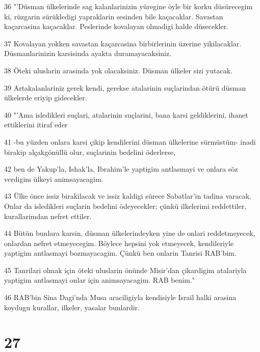 \par 36 "'Düsman ülkelerinde sag kalanlarinizin yüregine öyle bir korku düsürecegim ki, rüzgarin sürükledigi yapraklarin sesinden bile kaçacaklar. Savastan kaçarcasina kaçacaklar. Peslerinde kovalayan olmadigi halde düsecekler.
\par 37 Kovalayan yokken savastan kaçarcasina birbirlerinin üzerine yikilacaklar. Düsmanlarinizin karsisinda ayakta duramayacaksiniz.
\par 38 Öteki uluslarin arasinda yok olacaksiniz. Düsman ülkeler sizi yutacak.
\par 39 Artakalanlariniz gerek kendi, gerekse atalarinin suçlarindan ötürü düsman ülkelerde eriyip gidecekler.
\par 40 "'Ama isledikleri suçlari, atalarinin suçlarini, bana karsi geldiklerini, ihanet ettiklerini itiraf eder
\par 41 -bu yüzden onlara karsi çikip kendilerini düsman ülkelerine sürmüstüm- inadi birakip alçakgönüllü olur, suçlarinin bedelini öderlerse,
\par 42 ben de Yakup'la, Ishak'la, Ibrahim'le yaptigim antlasmayi ve onlara söz verdigim ülkeyi animsayacagim.
\par 43 Ülke önce issiz birakilacak ve issiz kaldigi sürece Sabatlar'in tadina varacak. Onlar da isledikleri suçlarin bedelini ödeyecekler; çünkü ilkelerimi reddettiler, kurallarimdan nefret ettiler.
\par 44 Bütün bunlara karsin, düsman ülkelerindeyken yine de onlari reddetmeyecek, onlardan nefret etmeyecegim. Böylece hepsini yok etmeyecek, kendileriyle yaptigim antlasmayi bozmayacagim. Çünkü ben onlarin Tanrisi RAB'bim.
\par 45 Tanrilari olmak için öteki uluslarin önünde Misir'dan çikardigim atalariyla yaptigim antlasmayi onlar için animsayacagim. RAB benim."
\par 46 RAB'bin Sina Dagi'nda Musa araciligiyla kendisiyle Israil halki arasina koydugu kurallar, ilkeler, yasalar bunlardir.

\chapter{27}

